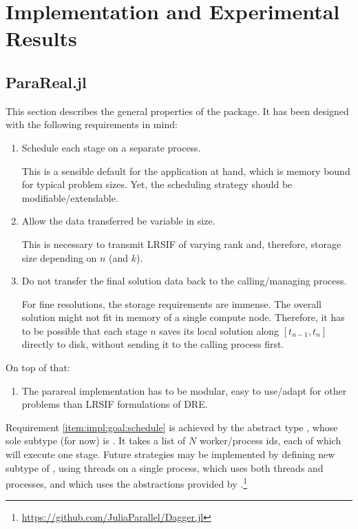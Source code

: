 \chapter{Implementation and Experimental Results}

\section{ParaReal.jl}

This section describes the general properties of the  package.
It has been designed with the following requirements in mind:
\begin{enumerate}
  \item\label{item:impl:goal:schedule}
    Schedule each stage on a separate process.

    This is a sensible default for the application at hand,
    which is memory bound for typical problem sizes.
    Yet, the scheduling strategy should be modifiable/extendable.
  \item\label{item:impl:goal:variablesize}
    Allow the data transferred be variable in size.

    This is necessary to transmit \ac{LRSIF} of varying rank and, therefore, storage size depending on $n$ (and $k$).
  \item\label{item:impl:goal:notransfer}
    Do not transfer the final solution data back to the calling/managing process.

    For fine resolutions, the storage requirements are immense.
    The overall solution might not fit in memory of a single compute node.
    Therefore, it has to be possible that each stage $n$ saves its local solution along $[t_{n-1},t_n]$ directly to disk,
    without sending it to the calling process first.
\end{enumerate}
On top of that:
\begin{enumerate}[resume]
  \item\label{item:impl:goal:modularity}
    The parareal implementation has to be modular,
    \ie easy to use/adapt for other problems than \ac{LRSIF} formulations of \ac{DRE}.
\end{enumerate}

Requirement \ref{item:impl:goal:schedule} is achieved by the abstract type ,
whose sole subtype (for now) is .
It takes a list of $N$ worker/process ids, each of which will execute one stage.
Future strategies may be implemented by defining new subtype of , \eg
{} using threads on a single process,
 which uses both threads and processes, and
 which uses the abstractions provided by .\footnote{\url{https://github.com/JuliaParallel/Dagger.jl}}

